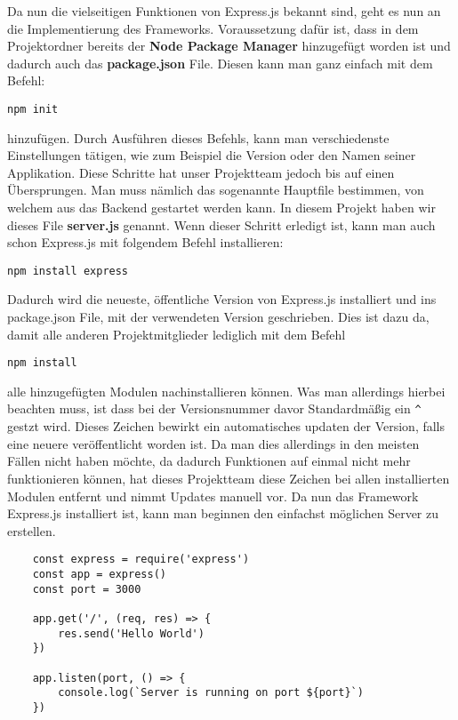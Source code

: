 Da nun die vielseitigen Funktionen von Express.js bekannt sind, geht es nun an die Implementierung des Frameworks. Voraussetzung dafür ist, dass in dem Projektordner bereits der \textbf{Node Package Manager} hinzugefügt worden ist und dadurch auch das \textbf{package.json} File. Diesen kann man ganz einfach mit dem Befehl:
\begin{verbatim}
npm init
\end{verbatim}
hinzufügen. Durch Ausführen dieses Befehls, kann man verschiedenste Einstellungen tätigen, wie zum Beispiel die Version oder den Namen seiner Applikation. Diese Schritte hat unser Projektteam jedoch bis auf einen Übersprungen. Man muss nämlich das sogenannte Hauptfile bestimmen, von welchem aus das Backend gestartet werden kann. In diesem Projekt haben wir dieses File \textbf{server.js} genannt. Wenn dieser Schritt erledigt ist, kann man auch schon Express.js mit folgendem Befehl installieren:
\begin{verbatim}
npm install express
\end{verbatim}
Dadurch wird die neueste, öffentliche Version von Express.js installiert und ins package.json File, mit der verwendeten Version geschrieben. Dies ist dazu da, damit alle anderen Projektmitglieder lediglich mit dem Befehl
\begin{verbatim}
npm install
\end{verbatim}
alle hinzugefügten Modulen nachinstallieren können. Was man allerdings hierbei beachten muss, ist dass bei der Versionsnummer davor Standardmäßig ein \verb|^| gestzt wird. Dieses Zeichen bewirkt ein automatisches updaten der Version, falls eine neuere veröffentlicht worden ist. Da man dies allerdings in den meisten Fällen nicht haben möchte, da dadurch Funktionen auf einmal nicht mehr funktionieren können, hat dieses Projektteam diese Zeichen bei allen installierten Modulen entfernt und nimmt Updates manuell vor.
\newline
\cite{installing_express_js}
\newline
Da nun das Framework Express.js installiert ist, kann man beginnen den einfachst möglichen Server zu erstellen.
\begin{lstlisting}
    const express = require('express')
    const app = express()
    const port = 3000

    app.get('/', (req, res) => {
        res.send('Hello World')
    })

    app.listen(port, () => {
        console.log(`Server is running on port ${port}`)
    })
\end{lstlisting}
